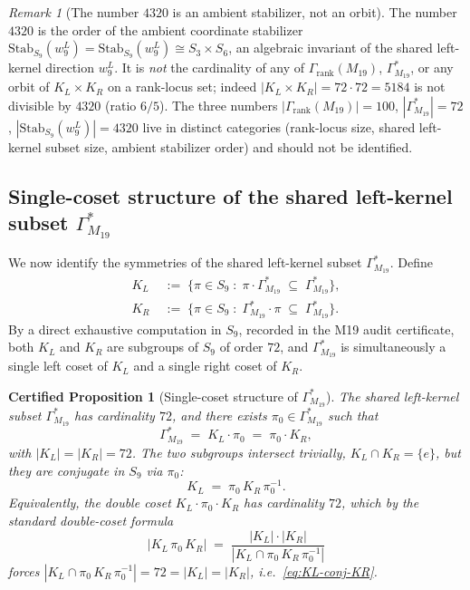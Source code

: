 \documentclass[11pt,a4paper]{article}
\newtheorem{certprop}[theorem]{Certified Proposition}
\theoremstyle{definition}
\theoremstyle{remark}
\newtheorem{remark}[theorem]{Remark}
\newcommand{\GrankM}{\Gamma_{\mathrm{rank}}(M_{19})}
\newcommand{\GMninetn}{\Gamma^{*}_{M_{19}}}     %
\newcommand{\wleftnine}{w^{L}_{9}}
\newcommand{\StabWnine}{\mathrm{Stab}_{S_9}(\wleftnine)}
\newcommand{\KL}{K_L}
\newcommand{\KR}{K_R}
\begin{document}
\begin{remark}[The number $4320$ is an ambient stabilizer, not an orbit]
\label{rem:4320-not-orbit}
The number $4320$ is the order of the ambient coordinate stabilizer
$\StabWnine = \mathrm{Stab}_{S_9}(\wleftnine) \cong S_3 \times S_6$, an
algebraic invariant of the shared left-kernel direction $\wleftnine$. It is \emph{not}
the cardinality of any of $\GrankM$, $\GMninetn$, or any orbit of
$\KL \times \KR$ on a rank-locus set; indeed
$|\KL \times \KR| = 72\cdot 72 = 5184$ is not divisible by $4320$
(ratio $6/5$). The three numbers $|\GrankM| = 100$, $|\GMninetn| = 72$,
$|\StabWnine| = 4320$ live in distinct categories (rank-locus size,
shared left-kernel subset size, ambient stabilizer order) and should not be
identified.
\end{remark}

\subsection{\texorpdfstring{Single-coset structure of the shared left-kernel subset $\GMninetn$}{Single-coset structure of the shared left-kernel subset}}
\label{sec:M19-coset}

We now identify the symmetries of the shared left-kernel subset $\GMninetn$.
Define
\begin{align}
   \KL &\;:=\; \bigl\{\pi \in S_9 \;:\; \pi \cdot \GMninetn \;\subseteq\;
      \GMninetn\bigr\}, \label{eq:KL-def}\\
   \KR &\;:=\; \bigl\{\pi \in S_9 \;:\; \GMninetn \cdot \pi \;\subseteq\;
      \GMninetn\bigr\}. \label{eq:KR-def}
\end{align}
By a direct exhaustive computation in $S_9$, recorded in the M19 audit
certificate, both $\KL$ and $\KR$ are subgroups of $S_9$ of order $72$,
and $\GMninetn$ is simultaneously a single left coset of $\KL$ and a
single right coset of $\KR$.

\begin{certprop}[Single-coset structure of $\GMninetn$]
\label{thm:M19-coset}
The shared left-kernel subset $\GMninetn$ has cardinality $72$, and there
exists $\pi_0 \in \GMninetn$ such that
\begin{equation}\label{eq:single-coset}
   \GMninetn \;=\; \KL \cdot \pi_0 \;=\; \pi_0 \cdot \KR,
\end{equation}
with $|\KL| = |\KR| = 72$. The two subgroups intersect trivially,
$\KL \cap \KR = \{e\}$, but they are conjugate in $S_9$ via $\pi_0$:
\begin{equation}\label{eq:KL-conj-KR}
   \KL \;=\; \pi_0\, \KR\, \pi_0^{-1}.
\end{equation}
Equivalently, the double coset $\KL \cdot \pi_0 \cdot \KR$ has
cardinality $72$, which by the standard double-coset formula
\begin{equation*}
   |\KL\, \pi_0\, \KR| \;=\;
   \frac{|\KL|\cdot|\KR|}{|\KL \cap \pi_0\, \KR\, \pi_0^{-1}|}
\end{equation*}
forces $|\KL \cap \pi_0\, \KR\, \pi_0^{-1}| = 72 = |\KL| = |\KR|$,
i.e.\ \eqref{eq:KL-conj-KR}.
\end{certprop}
\end{document}
